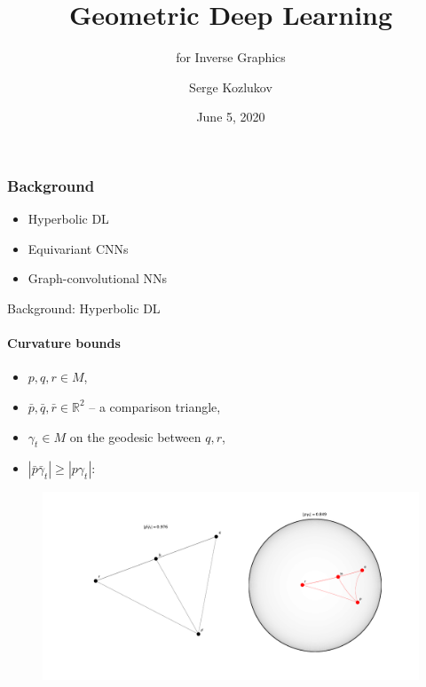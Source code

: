 \documentclass{beamer}
\title{Geometric Deep Learning}
\subtitle{for Inverse Graphics}
\author{Serge Kozlukov}
\institute{Skoltech}
\date{June 5, 2020}
\begin{document}
\frame{\titlepage}

\begin{frame}\frametitle{Background}
    \begin{itemize}
            \item Hyperbolic DL
            \item Equivariant CNNs
            \item Graph-convolutional NNs
    \end{itemize}
\end{frame}

\begin{frame}{Background: Hyperbolic DL}
    \framesubtitle{Curvature bounds}

    \begin{itemize}
        \item \( p, q, r \in M \),
        \item \( \bar{p}, \bar{q}, \bar{r} \in \mathbb{R}^2 \) -- a comparison triangle,
        \item \( \gamma_t \in M \) on the geodesic between \( q, r \),
        \item \( |\bar{p}\bar{\gamma}_t| \geq |p\gamma_t| \):
    \end{itemize}

    \begin{figure}\centering
        \includegraphics[width=.85\linewidth]{art/triangle-comparison.pdf}
    \end{figure}
\end{frame}
\end{document}
